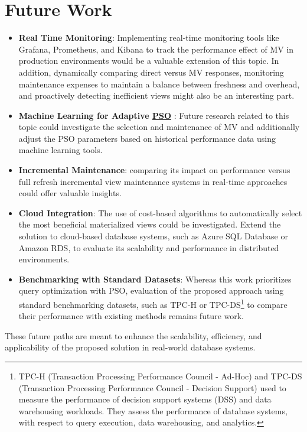 \section{Future Work}
\begin{itemize}

    \item \textbf{Real Time Monitoring}: Implementing real-time monitoring tools like Grafana, Prometheus, and Kibana to track the performance effect of MV in production environments would be a valuable extension of this topic. In addition, dynamically comparing direct versus MV responses, monitoring maintenance expenses to maintain a balance between freshness and overhead, and proactively detecting inefficient views might also be an interesting part.
       
    \item \textbf{Machine Learning for Adaptive \hyperref[sec:PSO]{PSO} }: Future research related to this topic could investigate the selection and maintenance of MV and additionally adjust the PSO parameters based on historical performance data using machine learning tools.
    
    \item \textbf{Incremental Maintenance}: comparing its impact on performance versus full refresh incremental view maintenance systems in real-time approaches could offer valuable insights.
    
    \item \textbf{Cloud Integration}: The use of cost-based algorithms to automatically select the most beneficial materialized views could be investigated. Extend the solution to cloud-based database systems, such as Azure SQL Database or Amazon RDS, to evaluate its scalability and performance in distributed environments.
    
    \item \textbf{Benchmarking with Standard Datasets}: Whereas this work prioritizes query optimization with PSO, evaluation of the proposed approach using standard benchmarking datasets, such as TPC-H or TPC-DS\footnote{TPC-H (Transaction Processing Performance Council - Ad-Hoc) and TPC-DS (Transaction Processing Performance Council - Decision Support) used to measure the performance of decision support systems (DSS) and data warehousing workloads. They assess the performance of database systems, with respect to query execution, data warehousing, and analytics.} to compare their performance with existing methods remains future work.
\end{itemize}

These future paths are meant to enhance the scalability, efficiency, and applicability of the proposed solution in real-world database systems.

